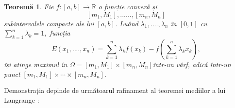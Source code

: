 \documentclass[a4paper,12pt,oneside]{report}
\newtheorem{theorem}{Teorem\u a}
\begin{document}
\begin{theorem}
Fie \(f : \left [ a,b \right ] \rightarrow \mathbb{R}\) o funcție convexă și 
\begin{displaymath}
   \left [ m_{1}, M_{1} \right ],......,\left [ m_{n}, M_{n} \right ]
\end{displaymath}
subintervalele compacte ale lui \(\left [ a,b \right ]\). Luând \(\lambda _{1}, ....,\lambda _{n}\) în \(\left [ 0,1 \right ]\) cu \(\sum_{k = 1}^{n}\lambda _{k} = 1,\) funcția 
\begin{displaymath}
   E \left ( x_{1},....,x_{n} \right ) = \sum_{k = 1}^{n}\lambda _{k}f\left ( x_{k} \right ) - f\left ( \sum_{k=1}^{n}\lambda _{k}x_{k} \right ), 
\end{displaymath}
își atinge maximul în \(\Omega = \left [ m_{1}, M_{1} \right ] \times  \left [ m_{n}, M_{n} \right ] \)într-un vârf, adică într-un punct \(\left [ m_{1}, M_{1} \right ] \times\cdots \times   \left [ m_{n}, M_{n} \right ].\) 
\end{theorem}
Demonstrația depinde de următoarul rafinament al teoremei mediilor a lui Langrange :
\end{document}
